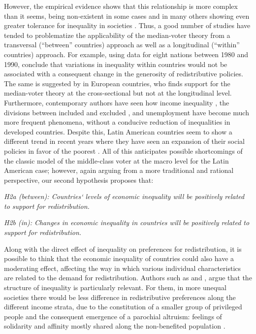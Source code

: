 \documentclass[utf8]{frontiersSCNS} %
\begin{document}
However, the empirical evidence shows that this relationship is more complex than it seems, being non-existent in some cases \parencite{lubker2007inequality} and in many others showing even greater tolerance for inequality in societies \parencite{Castillolegitimacyeconomicinequality2010, Sachwehwelfarestateequality2010,SchroderIncomeInequalityRelated2017,mijs2019paradox}. Thus, a good number of studies have tended to problematize the applicability of the median-voter theory from a transversal (“between” countries) approach \parencite{AlesinaFightingPovertyUS2004, KenworthyRisingInequalityPolitics2005} as well as a longitudinal (“within” countries) approach. For example, using data for eight nations between 1980 and 1990, \textcite{KenworthyInequalitypublicopinion2007} conclude that variations in inequality within countries would not be associated with a consequent change in the generosity of redistributive policies. The same is suggested by \textcite{Schmidt-CatranEconomicinequalitypublic2016} in European countries, who finds support for the median-voter theory at the cross-sectional but not at the longitudinal level.
Furthermore, contemporary authors have seen how income inequality \parencite{AtkinsonTopIncomesLong2011, HuberDevelopmentCrisisWelfare2001}, the divisions between included and excluded \parencite{RuedaSocialDemocracyOut2008}, and unemployment \parencite{RehmSocialPolicyPopular2011} have become much more frequent phenomena, without a conducive reduction of inequalities in developed countries. Despite this, Latin American countries seem to show a different trend in recent years where they have seen an expansion of their social policies in favor of the poorest \parencite{GarayIncludingOutsidersSocial2010, MaresSocialPolicyDeveloping2009}. All of this anticipates possible shortcomings of the classic model of the middle-class voter at the macro level for the Latin American case; however, again arguing from a more traditional and rational perspective, our second hypothesis proposes that:

\textit{H2a (between): Countries‘ levels of economic inequality will be positively related to support for redistribution.}

\textit{H2b (in): Changes in economic inequality in countries will be positively related to support for redistribution.}

Along with the direct effect of inequality on preferences for redistribution, it is possible to think that the economic inequality of countries could also have a moderating effect, affecting the way in which various individual characteristics are related to the demand for redistribution. Authors such as \textcite{LupuStructureInequalityPolitics2011} and \textcite{LuttigStructureInequalityAmericans2013}, argue that the structure of inequality is particularly relevant. For them, in more unequal societies there would be less difference in redistributive preferences along the different income strata, due to the constitution of a smaller group of privileged people and the consequent emergence of a parochial altruism: feelings of solidarity and affinity mostly shared along the non-benefited population \textcite{FowlerselfSocialidentity2007}.
\end{document}
